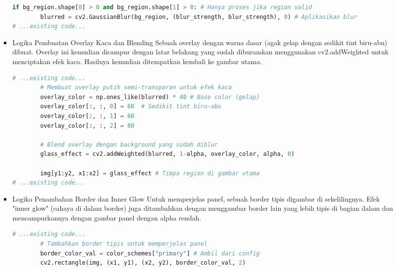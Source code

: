 \documentclass[11pt,a4paper]{article}
\begin{document}
\begin{itemize}
\begin{itemize}
\begin{itemize}
\begin{lstlisting}[language=Python, caption=Logika ekstraksi dan pemburaman latar belakang]
    if bg_region.shape[0] > 0 and bg_region.shape[1] > 0: # Hanya proses jika region valid
        blurred = cv2.GaussianBlur(bg_region, (blur_strength, blur_strength), 0) # Aplikasikan blur
# ...existing code...
\end{lstlisting}
\item Logika Pembuatan Overlay Kaca dan Blending
\newline Sebuah overlay dengan warna dasar (agak gelap dengan sedikit tint biru-abu) dibuat. Overlay ini kemudian dicampur dengan latar belakang yang sudah diburamkan menggunakan cv2.addWeighted untuk menciptakan efek kaca. Hasilnya kemudian ditempatkan kembali ke gambar utama.
\begin{lstlisting}[language=Python, caption=Logika pembuatan overlay kaca dan blending]
# ...existing code...
        # Membuat overlay putih semi-transparan untuk efek kaca
        overlay_color = np.ones_like(blurred) * 40 # Base color (gelap)
        overlay_color[:, :, 0] = 60  # Sedikit tint biru-abu
        overlay_color[:, :, 1] = 60
        overlay_color[:, :, 2] = 80
        
        # Blend overlay dengan background yang sudah diblur
        glass_effect = cv2.addWeighted(blurred, 1-alpha, overlay_color, alpha, 0)
        
        img[y1:y2, x1:x2] = glass_effect # Timpa region di gambar utama
# ...existing code...
\end{lstlisting}
\item Logika Penambahan Border dan Inner Glow
\newline Untuk memperjelas panel, sebuah border tipis digambar di sekelilingnya. Efek "inner glow" (cahaya di dalam border) juga ditambahkan dengan menggambar border lain yang lebih tipis di bagian dalam dan mencampurkannya dengan gambar panel dengan alpha rendah.
\begin{lstlisting}[language=Python, caption=Logika penambahan border dan inner glow]
# ...existing code...
        # Tambahkan border tipis untuk memperjelas panel
        border_color_val = color_schemes["primary"] # Ambil dari config
        cv2.rectangle(img, (x1, y1), (x2, y2), border_color_val, 2)
        

\end{lstlisting}
\end{itemize}
\end{itemize}
\end{itemize}
\end{document}
